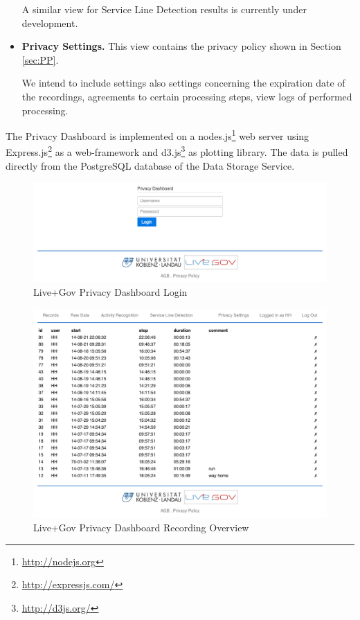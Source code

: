 \begin{itemize}
   A similar view for Service Line Detection results is currently
   under development.
 \item \textbf{Privacy Settings.}
   This view contains the privacy policy shown in Section \ref{sec:PP}.

   We intend to include settings also settings concerning the
   expiration date of the recordings, agreements to certain processing
   steps, view logs of performed processing.
\end{itemize}

The Privacy Dashboard is implemented on a
nodes.js\footnote{\url{http://nodejs.org}} web server using
Express.js\footnote{\url{http://expressjs.com/}} as a web-framework
and d3.js\footnote{\url{http://d3js.org/}} as plotting library. The
data is pulled directly from the PostgreSQL database of the Data
Storage Service.

\begin{figure}
\includegraphics[width=\textwidth]{screenshots/login.png}
\caption{Live+Gov Privacy Dashboard Login}
\label{fig:PDLogin}
\end{figure}

\begin{figure}
\includegraphics[width=\textwidth]{screenshots/recordings.png}
\caption{Live+Gov Privacy Dashboard Recording Overview}
\label{fig:PDOverview}
\end{figure}

